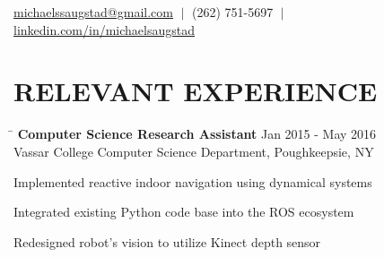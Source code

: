\documentclass{res}
\newcommand{\vb}{\; | \;}
\begin{document}
 
                                  
\begin{resume}
\vspace{-5pt}
{\large %
  \begin{center}
    \href{mailto:michaelssaugstad@gmail.com}{michaelssaugstad@gmail.com} $\vb$
    (262) 751-5697 $\vb$
    \href{https://www.linkedin.com/in/michaelsaugstad/}
         {linkedin.com/in/michaelsaugstad}
  \end{center}

  \vspace{-1pt}
  \section{\hspace{0.3in}RELEVANT EXPERIENCE}
    \vspace{-3pt}
    \begin{tabbing}
      \hspace{5.65in}\=  \kill %
      {\bf Computer Science Research Assistant}
      \>Jan 2015 - May 2016\\
      Vassar College Computer Science Department, Poughkeepsie, NY\\     
    \end{tabbing}
    \vspace{-24pt}      %
    \begin{list}{\bf{-}}{}
      \setlength{\itemsep}{-2pt}
      \item Implemented reactive indoor navigation using dynamical systems
      \item Integrated existing Python code base into the ROS ecosystem
      \item Redesigned robot's vision to utilize Kinect depth sensor
    \end{list}

}
\end{resume}
\end{document}
